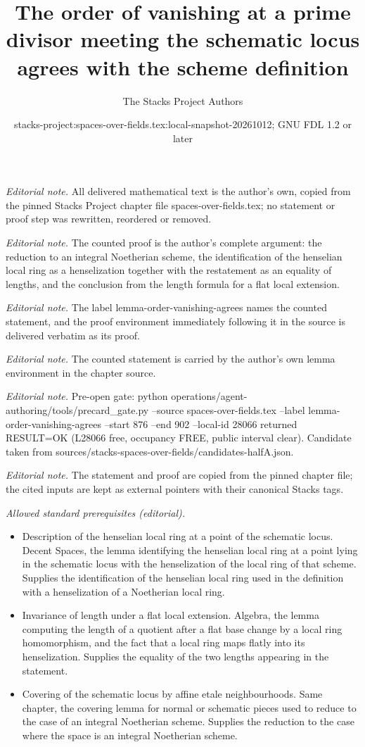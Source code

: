 \documentclass[10pt,a4paper]{amsart}
\title{The order of vanishing at a prime divisor meeting the schematic locus agrees with the scheme definition}
\author{The Stacks Project Authors}
\date{stacks-project:spaces-over-fields.tex:local-snapshot-20261012; GNU FDL 1.2 or later}
\theoremstyle{plain}
\theoremstyle{definition}
\theoremstyle{remark}
\numberwithin{equation}{subsection}
\begin{document}
\maketitle
\noindent\textit{Editorial note.} All delivered mathematical text is the author's own, copied from the pinned Stacks Project chapter file spaces-over-fields.tex; no statement or proof step was rewritten, reordered or removed.\par\medskip
\noindent\textit{Editorial note.} The counted proof is the author's complete argument: the reduction to an integral Noetherian scheme, the identification of the henselian local ring as a henselization together with the restatement as an equality of lengths, and the conclusion from the length formula for a flat local extension.\par\medskip
\noindent\textit{Editorial note.} The label lemma-order-vanishing-agrees names the counted statement, and the proof environment immediately following it in the source is delivered verbatim as its proof.\par\medskip
\noindent\textit{Editorial note.} The counted statement is carried by the author's own lemma environment in the chapter source.\par\medskip
\noindent\textit{Editorial note.} Pre-open gate: python operations/agent-authoring/tools/precard\_gate.py --source spaces-over-fields.tex --label lemma-order-vanishing-agrees --start 876 --end 902 --local-id 28066 returned RESULT=OK (L28066 free, occupancy FREE, public interval clear). Candidate taken from sources/stacks-spaces-over-fields/candidates-halfA.json.\par\medskip
\noindent\textit{Editorial note.} The statement and proof are copied from the pinned chapter file; the cited inputs are kept as external pointers with their canonical Stacks tags.\par\medskip
\noindent\textit{Allowed standard prerequisites (editorial).}\begin{itemize}
\item Description of the henselian local ring at a point of the schematic locus. Decent Spaces, the lemma identifying the henselian local ring at a point lying in the schematic locus with the henselization of the local ring of that scheme. Supplies the identification of the henselian local ring used in the definition with a henselization of a Noetherian local ring.
\item Invariance of length under a flat local extension. Algebra, the lemma computing the length of a quotient after a flat base change by a local ring homomorphism, and the fact that a local ring maps flatly into its henselization. Supplies the equality of the two lengths appearing in the statement.
\item Covering of the schematic locus by affine etale neighbourhoods. Same chapter, the covering lemma for normal or schematic pieces used to reduce to the case of an integral Noetherian scheme. Supplies the reduction to the case where the space is an integral Noetherian scheme.
\end{itemize}\medskip
\end{document}
